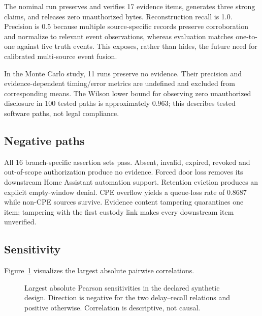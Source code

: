﻿\documentclass[10pt,a4paper,twocolumn]{article}
\begin{document}
The nominal run preserves and verifies 17 evidence items, generates three strong claims, and releases zero unauthorized bytes. Reconstruction recall is 1.0. Precision is 0.5 because multiple source-specific records preserve corroboration and normalize to relevant event observations, whereas evaluation matches one-to-one against five truth events. This exposes, rather than hides, the future need for calibrated multi-source event fusion.

In the Monte Carlo study, 11 runs preserve no evidence. Their precision and evidence-dependent timing/error metrics are undefined and excluded from corresponding means. The Wilson lower bound for observing zero unauthorized disclosure in 100 tested paths is approximately 0.963; this describes tested software paths, not legal compliance.

\subsection{Negative paths}

All 16 branch-specific assertion sets pass. Absent, invalid, expired, revoked and out-of-scope authorization produce no evidence. Forced door loss removes its downstream Home Assistant automation support. Retention eviction produces an explicit empty-window denial. CPE overflow yields a queue-loss rate of 0.8687 while non-CPE sources survive. Evidence content tampering quarantines one item; tampering with the first custody link makes every downstream item unverified.

\subsection{Sensitivity}

Figure~\ref{fig:sensitivity} visualizes the largest absolute pairwise correlations.

\begin{figure}[t]
\centering
{}
\caption{Largest absolute Pearson sensitivities in the declared synthetic design. Direction is negative for the two delay--recall relations and positive otherwise. Correlation is descriptive, not causal.}
\label{fig:sensitivity}
\end{figure}
\end{document}
